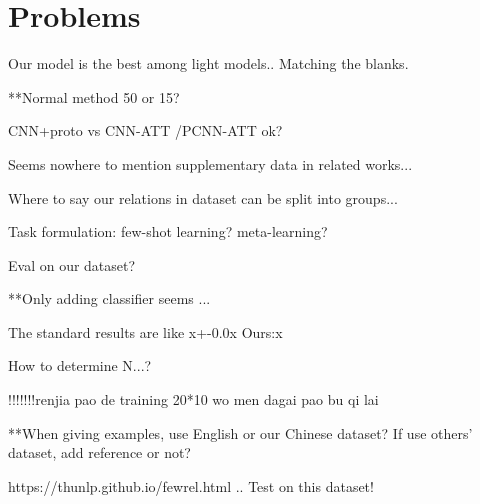 \section{Problems}
Our model is the best among light models.. Matching the blanks.

**Normal method 50 or 15?

CNN+proto vs CNN-ATT /PCNN-ATT ok?

Seems nowhere to mention supplementary data in related works...

Where to say our relations in dataset can be split into groups...

Task formulation: few-shot learning? meta-learning?

Eval on our dataset?

**Only adding classifier seems ...

The standard results are like x+-0.0x Ours:x

How to determine N...?

!!!!!!!renjia pao de training 20*10 wo men dagai pao bu qi lai

**When giving examples, use English or our Chinese dataset? If use others' dataset, add reference or not?

https://thunlp.github.io/fewrel.html .. Test on this dataset!
